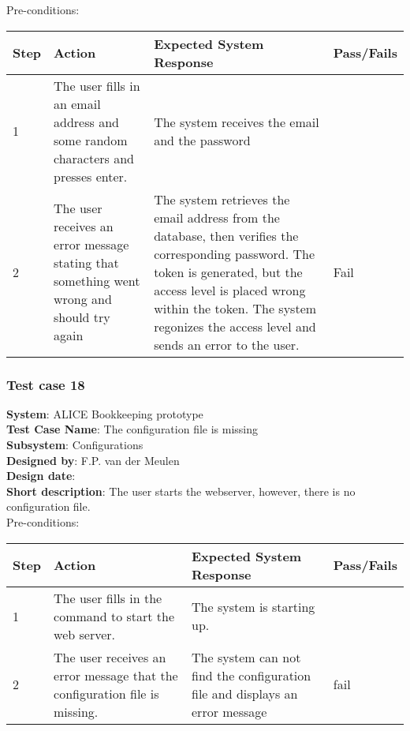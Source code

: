 Pre-conditions: \\

\begin{longtable}{ | p{0.8cm} | p{4.5cm} | p{6cm} | p{1.5cm} |}
\hline
Step & Action & Expected System Response & Pass/Fails  \\ \hline
1 & The user fills in an email address and some random characters and presses enter. & The system receives the email and the password &  \\ \hline
2 & The user receives an error message stating that something went wrong and should try again & The system retrieves the email address from the database, then verifies the corresponding password.  The token is generated, but the access level is placed wrong within the token. The system regonizes the access level and sends an error to the user. & Fail \\ \hline
\end{longtable}

\subsubsection{Test case 18}
\textbf{System}:  ALICE Bookkeeping prototype \\
\textbf{Test Case Name}:  The configuration file is missing \\
\textbf{Subsystem}:  Configurations \\
\textbf{Designed by}:  F.P. van der Meulen\\
\textbf{Design date}:  \\
\textbf{Short description}: The user starts the webserver, however, there is no configuration file. \\

Pre-conditions: \\

\begin{longtable}{ | p{0.8cm} | p{4.5cm} | p{6cm} | p{1.5cm} |}
\hline
Step & Action & Expected System Response & Pass/Fails  \\ \hline
1 & The user fills in the command to start the web server. & The system is starting up. &  \\ \hline
2 & The user receives an error message that the configuration file is missing. & The system can not find the configuration file and displays an error message & fail\\ \hline
 
\end{longtable}

